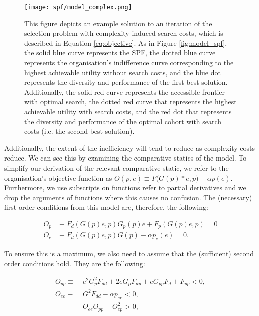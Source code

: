 \begin{figure}[!htb]
    \centering
    \texttt{[image: spf/model\_complex.png]} 
    \caption{This figure depicts an example solution to an iteration of the selection problem with complexity induced search costs, which is described in Equation \ref{eq:objective}. As in Figure \ref{fig:model_spf}, the solid blue curve represents the SPF, the dotted blue curve represents the organisation's indifference curve corresponding to the highest achievable utility without search costs, and the blue dot represents the diversity and performance of the first-best solution. Additionally, the solid red curve represents the accessible frontier with optimal search, the dotted red curve that represents the highest achievable utility with search costs, and the red dot that represents the diversity and performance of the optimal cohort with search costs (i.e. the second-best solution).}
    \label{fig:model_complex}
\end{figure}

Additionally, the extent of the inefficiency will tend to reduce as complexity costs reduce. We can see this by examining the comparative statics of the model. To simplify our derivation of the relevant comparative static, we refer to the organisation's objective function as $O(p,e)\equiv F\Big(G(p)*e ,p\Big) - \alpha p(e)$. Furthermore, we use subscripts on functions refer to partial derivatives and we drop the arguments of functions where this causes no confusion. The (necessary) first order conditions from this model are, therefore, the following:

\begin{align}
O_p & \equiv F_{d}(G(p)e,p)G_p(p)e + F_p(G(p)e,p) = 0 \nonumber \\
O_e & \equiv F_{d}(G(p)e,p)G(p) - \alpha p_e(e) = 0. \nonumber
\end{align}

To ensure this is a maximum, we also need to assume that the (sufficient) second order conditions hold. They are the following:

\begin{align}
O_{pp} \equiv &\;  e^2G_p^2F_{dd} + 2eG_pF_{dp} + eG_{pp}F_d + F_{pp} < 0, \nonumber \\
O_{ee}  \equiv &\;  G^2F_{dd} - \alpha p_{ee} < 0, \nonumber \\
&  \; O_{ee}O_{pp} - O_{ep}^2 > 0, \nonumber
\end{align}

